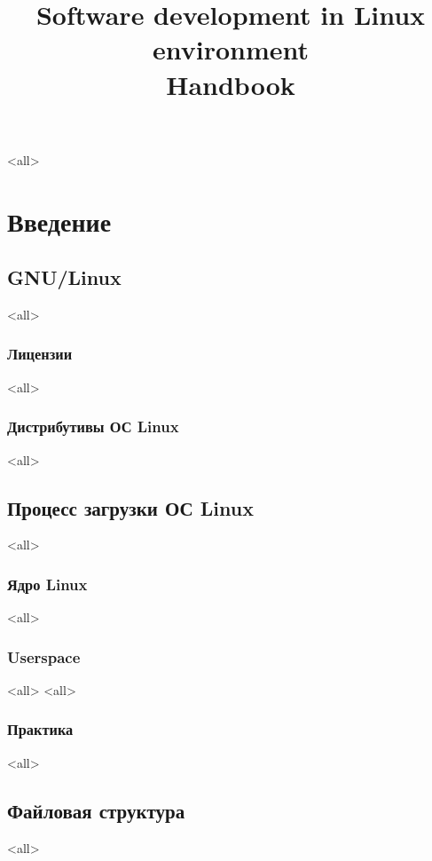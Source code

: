 

\title{Software development in Linux environment\\Handbook}

\mode<all>{}


\maketitle

\tableofcontents


\part{Введение}

\chapter{GNU/Linux}
\mode<all>{}
\section{Лицензии}
\mode<all>{}
\section{Дистрибутивы ОС Linux}
\mode<all>{}

\chapter{Процесс загрузки ОС Linux}
\mode<all>{}
\section{Ядро Linux}
\mode<all>{}
\section{Userspace}
\mode<all>{}
\mode<all>{}
\section{Практика}
\mode<all>{}

\chapter{Файловая структура}
\mode<all>{}

